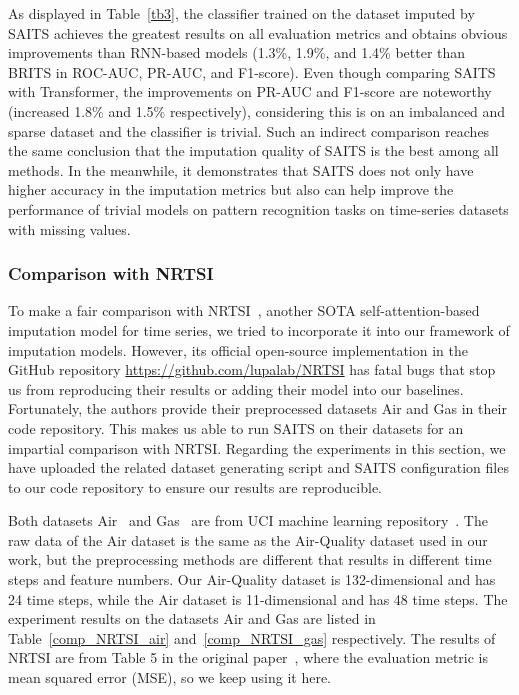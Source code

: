 \documentclass{article}
\begin{document}
As displayed in Table~\ref{tb3}, the classifier trained on the dataset imputed by SAITS achieves the greatest results on all evaluation metrics and obtains obvious improvements than RNN-based models (1.3\%, 1.9\%, and 1.4\% better than BRITS in ROC-AUC, PR-AUC, and F1-score). Even though comparing SAITS with Transformer, the improvements on PR-AUC and F1-score are noteworthy (increased 1.8\% and 1.5\% respectively), considering this is on an imbalanced and sparse dataset and the classifier is trivial. Such an indirect comparison reaches the same conclusion that the imputation quality of SAITS is the best among all methods. In the meanwhile, it demonstrates that SAITS does not only have higher accuracy in the imputation metrics but also can help improve the performance of trivial models on pattern recognition tasks on time-series datasets with missing values.

\subsubsection{Comparison with NRTSI} \label{Comp_with_NRTSI}
To make a fair comparison with NRTSI~\cite{Shan2021NRTSI}, another SOTA self-attention-based imputation model for time series, we tried to incorporate it into our framework of imputation models. However, its official open-source implementation in the GitHub repository \url{https://github.com/lupalab/NRTSI} has fatal bugs that stop us from reproducing their results or adding their model into our baselines. Fortunately, the authors provide their preprocessed datasets Air and Gas in their code repository. This makes us able to run SAITS on their datasets for an impartial comparison with NRTSI. Regarding the experiments in this section, we have uploaded the related dataset generating script and SAITS configuration files to our code repository to ensure our results are reproducible.

Both datasets Air~\cite{Zhang2017AirQuality} and Gas~\cite{Burgues2018Gas} are from UCI machine learning repository~\cite{Dua2017UCI}. The raw data of the Air dataset is the same as the Air-Quality dataset used in our work, but the preprocessing methods are different that results in different time steps and feature numbers. Our Air-Quality dataset is 132-dimensional and has 24 time steps, while the Air dataset is 11-dimensional and has 48 time steps. The experiment results on the datasets Air and Gas are listed in Table~\ref{comp_NRTSI_air} and~\ref{comp_NRTSI_gas} respectively. The results of NRTSI are from Table 5 in the original paper~\cite{Shan2021NRTSI}, where the evaluation metric is mean squared error (MSE), so we keep using it here.
\end{document}
